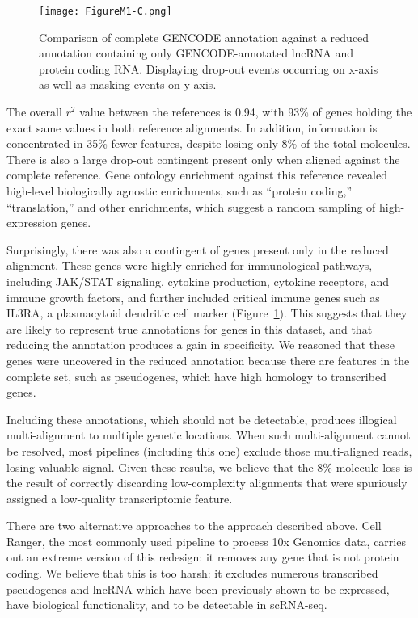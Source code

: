 \begin{figure}
\centering
\texttt{[image: FigureM1-C.png]}
\caption{Comparison of complete GENCODE annotation against a reduced annotation containing only GENCODE-annotated lncRNA and protein coding RNA\@. Displaying drop-out events occurring on x-axis as well as masking events on y-axis.}
\label{fig:m1c}
\end{figure}

The overall $r^2$ value between the references is 0.94, with 93\% of genes holding the exact same values in both reference alignments. 
In addition, information is concentrated in 35\% fewer features, despite losing only 8\% of the total molecules. 
There is also a large drop-out contingent present only when aligned against the complete reference. 
Gene ontology enrichment against this reference revealed high-level biologically agnostic enrichments, such as ``protein coding,'' ``translation,'' and other enrichments, which suggest a random sampling of high-expression genes.

Surprisingly, there was also a contingent of genes present only in the reduced alignment. 
These genes were highly enriched for immunological pathways, including JAK/STAT signaling, cytokine production, cytokine receptors, and immune growth factors, and further included critical immune genes such as IL3RA, a plasmacytoid dendritic cell marker (Figure~\ref{fig:m1c}).  
This suggests that they are likely to represent true annotations for genes in this dataset, and that reducing the annotation produces a gain in specificity. 
We reasoned that these genes were uncovered in the reduced annotation because there are features in the complete set, such as pseudogenes, which have high homology to transcribed genes. 

Including these annotations, which should not be detectable, produces illogical multi-alignment to multiple genetic locations. 
When such multi-alignment cannot be resolved, most pipelines (including this one) exclude those multi-aligned reads, losing valuable signal. 
Given these results, we believe that the 8\% molecule loss is the result of correctly discarding low-complexity alignments that were spuriously assigned a low-quality transcriptomic feature.

There are two alternative approaches to the approach described above. 
Cell Ranger, the most commonly used pipeline to process 10x Genomics data, carries out an extreme version of this redesign: it removes any gene that is not protein coding. 
We believe that this is too harsh: it excludes numerous transcribed pseudogenes and lncRNA which have been previously shown to be expressed, have biological functionality, and to be detectable in scRNA-seq.

